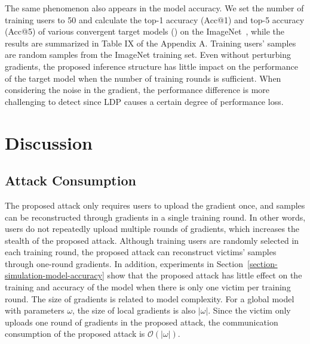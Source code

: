 \documentclass[lettersize,journal]{IEEEtran}
\begin{document}
The same phenomenon also appears in the model accuracy. 
We set the number of training users to 50 and calculate the top-1 accuracy (Acc@1) and top-5 accuracy (Acc@5) of various convergent target models (\cite{liu2022convnet,huang2018densely,tan2020efficientnet,szegedy2014going}) on the ImageNet~\cite{ILSVRC15}, while the results are summarized in Table $\mathrm{IX}$ of the Appendix A. 
Training users' samples are random samples from the ImageNet training set. Even without perturbing gradients, the proposed inference structure has little impact on the performance of the target model when the number of training rounds is sufficient. When considering the noise in the gradient, the performance difference is more challenging to detect since LDP causes a certain degree of performance loss.

\section{Discussion}
\subsection{Attack Consumption}

The proposed attack only requires users to upload the gradient once, and samples can be reconstructed through gradients in a single training round. In other words, users do not repeatedly upload multiple rounds of gradients, which increases the stealth of the proposed attack. Although training users are randomly selected in each training round, the proposed attack can reconstruct victims' samples through one-round gradients. In addition, experiments in Section~\ref{section-simulation-model-accuracy} show that the proposed attack has little effect on the training and accuracy of the model when there is only one victim per training round. The size of gradients is related to model complexity. For a global model with parameters $\omega$, the size of local gradients is also $\left|\omega\right|$. Since the victim only uploads one round of gradients in the proposed attack, the communication consumption of the proposed attack is $\mathcal{O}(\left|\omega\right|)$.
\end{document}

